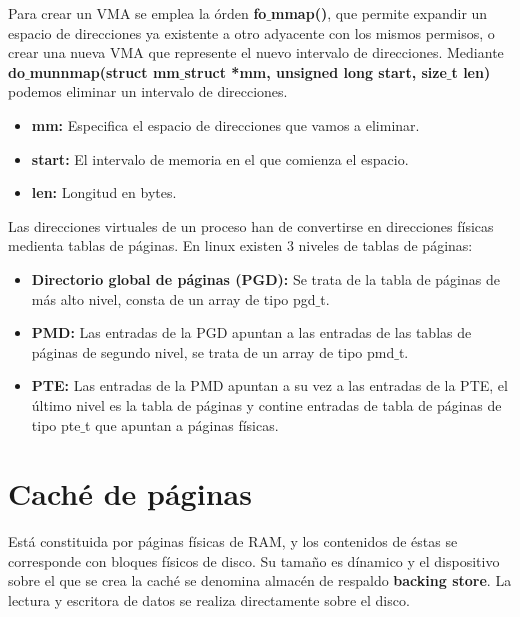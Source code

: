 Para crear un VMA se emplea la órden \textbf{fo$\_$mmap()}, que permite expandir un espacio de direcciones ya existente a otro adyacente con los mismos permisos, o crear una nueva VMA que represente el nuevo intervalo de direcciones. Mediante \textbf{do$\_$munnmap(struct mm$\_$struct *mm, unsigned long start, size$\_$t len)} podemos eliminar un intervalo de direcciones.

\begin{itemize}
	\item\textbf{mm:} Especifica el espacio de direcciones que vamos a eliminar.
	\item\textbf{start:} El intervalo de memoria en el que comienza el espacio.
	\item\textbf{len:} Longitud en bytes.
\end{itemize}

Las direcciones virtuales de un proceso han de convertirse en direcciones físicas medienta tablas de páginas. En linux existen 3 niveles de tablas de páginas:

\begin{itemize}
	\item\textbf{Directorio global de páginas (PGD):} Se trata de la tabla de páginas de más alto nivel, consta de un array de tipo pgd$\_$t.
	\item\textbf{PMD:} Las entradas de la PGD apuntan a las entradas de las tablas de páginas de segundo nivel, se trata de un array de tipo pmd$\_$t.
	\item\textbf{PTE:} Las entradas de la PMD apuntan a su vez a las entradas de la PTE, el último nivel es la tabla de páginas y contine entradas de tabla de páginas de tipo pte$\_$t que apuntan a páginas físicas.
\end{itemize}

\section*{Caché de páginas}
Está constituida por páginas físicas de RAM, y los contenidos de éstas se corresponde con bloques físicos de disco. Su tamaño es dínamico y el dispositivo sobre el que se crea la caché se denomina almacén de respaldo \textbf{backing store}. La lectura y escritora de datos se realiza directamente sobre el disco.

